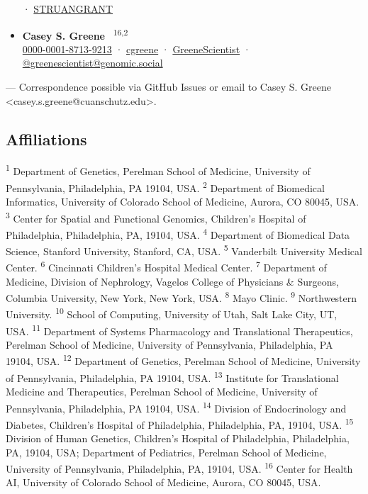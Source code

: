 \documentclass[
  a4paper,
]{article}
\begin{document}
\begin{itemize}
  · 
  \href{https://twitter.com/STRUANGRANT}{STRUANGRANT}
\item
  \textbf{Casey S. Greene}~\textsuperscript{\protect\hyperlink{correspondence}{\Letter}} \textsuperscript{16,2} \\
  
  \href{https://orcid.org/0000-0001-8713-9213}{0000-0001-8713-9213}
  · 
  \href{https://github.com/cgreene}{cgreene}
  · 
  \href{https://twitter.com/GreeneScientist}{GreeneScientist}
  · 
  \href{https://genomic.social/@greenescientist}{@greenescientist@genomic.social}
\end{itemize}

\leavevmode{}%
{\Letter} --- Correspondence possible via GitHub Issues
or email to
Casey S. Greene \textless casey.s.greene@cuanschutz.edu\textgreater.

\hypertarget{affiliations}{%
\subsection{Affiliations}\label{affiliations}}

\textsuperscript{1} Department of Genetics, Perelman School of Medicine, University of Pennsylvania, Philadelphia, PA 19104, USA.
\textsuperscript{2} Department of Biomedical Informatics, University of Colorado School of Medicine, Aurora, CO 80045, USA.
\textsuperscript{3} Center for Spatial and Functional Genomics, Children's Hospital of Philadelphia, Philadelphia, PA, 19104, USA.
\textsuperscript{4} Department of Biomedical Data Science, Stanford University, Stanford, CA, USA.
\textsuperscript{5} Vanderbilt University Medical Center.
\textsuperscript{6} Cincinnati Children's Hospital Medical Center.
\textsuperscript{7} Department of Medicine, Division of Nephrology, Vagelos College of Physicians \& Surgeons, Columbia University, New York, New York, USA.
\textsuperscript{8} Mayo Clinic.
\textsuperscript{9} Northwestern University.
\textsuperscript{10} School of Computing, University of Utah, Salt Lake City, UT, USA.
\textsuperscript{11} Department of Systems Pharmacology and Translational Therapeutics, Perelman School of Medicine, University of Pennsylvania, Philadelphia, PA 19104, USA.
\textsuperscript{12} Department of Genetics, Perelman School of Medicine, University of Pennsylvania, Philadelphia, PA 19104, USA.
\textsuperscript{13} Institute for Translational Medicine and Therapeutics, Perelman School of Medicine, University of Pennsylvania, Philadelphia, PA 19104, USA.
\textsuperscript{14} Division of Endocrinology and Diabetes, Children's Hospital of Philadelphia, Philadelphia, PA, 19104, USA.
\textsuperscript{15} Division of Human Genetics, Children's Hospital of Philadelphia, Philadelphia, PA, 19104, USA; Department of Pediatrics, Perelman School of Medicine, University of Pennsylvania, Philadelphia, PA, 19104, USA.
\textsuperscript{16} Center for Health AI, University of Colorado School of Medicine, Aurora, CO 80045, USA.
\end{document}
